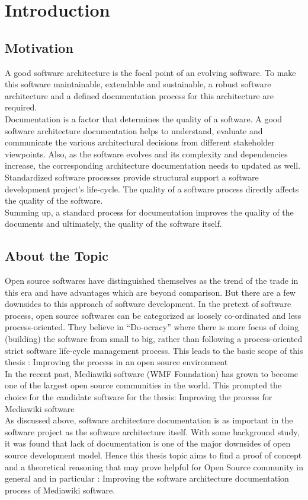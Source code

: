 \chapter{Introduction}\label{chapter:Introduction}

\section{Motivation}\label{sec:motiv}
\indent A good software architecture is the focal point of an evolving software.  To make this software maintainable, extendable and sustainable, a robust software architecture and a defined documentation process for this architecture are required.
\\\indent Documentation is a factor that determines the quality of a software. A good software architecture documentation helps to understand, evaluate and communicate the various architectural decisions from different stakeholder viewpoints. Also, as the software evolves and its complexity and dependencies increase, the corresponding architecture documentation needs to updated as well.
\\\indent Standardized software processes provide structural support a software development project's life-cycle. The quality of a software process directly affects the quality of the software.
\\\indent Summing up, a standard process for documentation improves the quality of the documents and ultimately, the quality of the software itself.

\section{About the Topic}\label{sec:about}
\indent Open source softwares have distinguished themselves as the trend of the trade in this era and have advantages which are beyond comparison. But there are a few downsides to this approach of software development. In the pretext of software process, open source softwares can be categorized as loosely co-ordinated and less process-oriented. They believe in \enquote{Do-ocracy} where there is more focus of doing (building) the software from small to big, rather than following a process-oriented strict software life-cycle management process. This leads to the basic scope of this thesis : Improving the process in an open source environment
\\\indent In the recent past, Mediawiki software (WMF Foundation) has grown to become one of the largest open source communities in the world. This prompted the choice for the candidate software for the thesis: Improving the process for Mediawiki software
\\\indent As discussed above, software architecture documentation is as important in the software project as the software architecture itself. With some background study, it was found that lack of documentation is one of the major downsides of open source development model. Hence this thesis topic aims to find a proof of concept  and a theoretical reasoning that may prove helpful for Open Source community in general and in particular  : Improving the software architecture documentation process of Mediawiki software.


